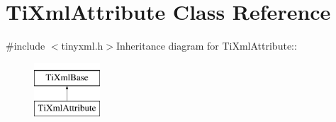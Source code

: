 \hypertarget{class_ti_xml_attribute}{
\section{TiXmlAttribute Class Reference}
\label{class_ti_xml_attribute}
}


{\ttfamily \#include $<$tinyxml.h$>$}Inheritance diagram for TiXmlAttribute::\begin{figure}[H]
\begin{center}
\leavevmode
\includegraphics[height=2cm]{class_ti_xml_attribute}
\end{center}
\end{figure}
